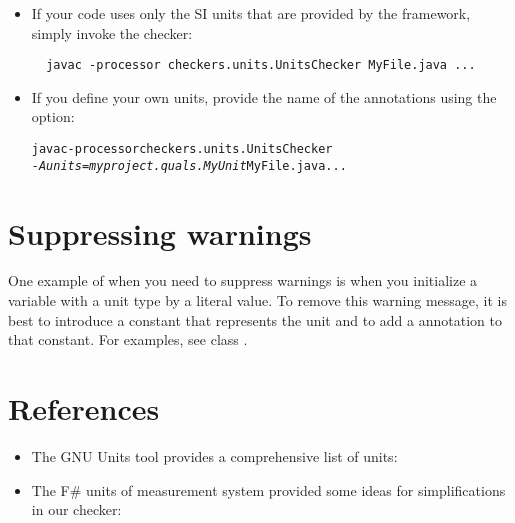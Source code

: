 \begin{itemize}
\item
If your code uses only the SI units that are provided by the
framework, simply invoke the checker:

\begin{Verbatim}
  javac -processor checkers.units.UnitsChecker MyFile.java ...
\end{Verbatim}

\item 
If you define your own units, provide the name of the annotations using the
 option:

\begin{alltt}
  javac -processor checkers.units.UnitsChecker
        \textit{-Aunits=myproject.quals.MyUnit} MyFile.java ...
\end{alltt}
\end{itemize}



\section{Suppressing warnings\label{units-suppressing}}

One example of when you need to suppress warnings is when you
initialize a variable with a unit type by a literal value.
To remove this warning message, it is best to introduce a
constant that represents the unit and to
add a 
annotation to that constant.
For examples, see class .


\section{References\label{units-references}}

\begin{itemize}
\item The GNU Units tool provides a comprehensive list of units:\\

\item The F\# units of measurement system provided some ideas for
simplifications in our checker:\\

\end{itemize}
